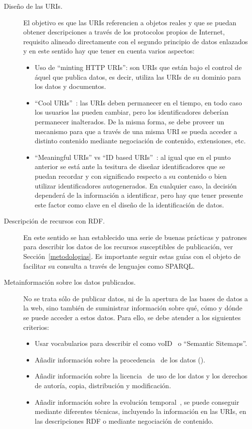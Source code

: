 \begin{description}
 \item [Diseño de las \gls{URI}s.] El objetivo es que las URIs referencien a objetos reales y que se puedan obtener
descripciones a través de los protocolos propios de Internet, requisito alineado directamente con el segundo principio de datos
enlazados y en este sentido hay que tener en cuenta varios aspectos: 
\begin{itemize}
 \item Uso de ``minting \gls{HTTP URI}s'': son URIs que están bajo el control de áquel que publica datos, es decir, utiliza
las URIs de su dominio para los datos y documentos.
\item ``Cool URIs''~\cite{Sauermann+2007a,bernerslee1998uri}: las URIs deben permanecer en el tiempo, en todo caso los usuarios las pueden cambiar, pero los identificadores
deberían permanecer inalterados. De la misma forma, se debe proveer un mecanismo para que a través de una misma URI se pueda
acceder a distinto contenido mediante negociación de contenido, extensiones, etc. 
\item ``Meaningful URIs'' vs ``ID based URIs''~\cite{uris-uk}: al igual que en el punto anterior se está ante la tesitura
de diseñar identificadores que se puedan recordar y con significado respecto a su contenido o bien utilizar
identificadores autogenerados. En cualquier caso, la decisión dependerá de la información a identificar, pero 
hay que tener presente este factor como clave en el diseño de la identificación de datos.
\end{itemize}
\item [Descripción de recursos con \gls{RDF}.] En este sentido se han establecido una serie de buenas prácticas y patrones
para describir los datos de los recursos susceptibles de publicación, ver Sección~\ref{metodologias}. Es importante seguir estas guías con el objeto de facilitar
su consulta a través de lenguajes como \gls{SPARQL}.
\item [Metainformación sobre los datos publicados.] No se trata sólo de publicar datos, ni de la apertura de las bases de datos
a la web, sino también de suministrar información sobre qué, cómo y dónde se puede acceder a estos datos. Para ello,
se debe atender a los siguientes criterios:
\begin{itemize}
 \item Usar vocabularios para describir el \dataset como \gls{voID}~\cite{void} o ``Semantic Sitemaps''\cite{Cyganiak08semanticsitemaps}.
 \item Añadir información sobre la procedencia~\cite{DBLP:conf/ipaw/HartigZ10,w3c-prov} de los datos (\provenance).
 \item Añadir información sobre la licencia~\cite{ld-licencias} de uso de los datos y los derechos de autoría, copia, distribución y modificación.
 \item Añadir información sobre la evolución temporal~\cite{ld-memento}, se puede conseguir mediante diferentes técnicas, incluyendo
la información en las URIs, en las descripciones RDF o mediante negociación de contenido.
\end{itemize}


\end{description}
